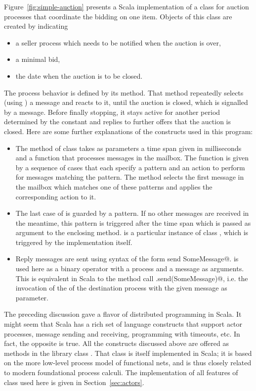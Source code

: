 \documentclass[11pt]{report}
\begin{document}
Figure~\ref{fig:simple-auction} presents a Scala implementation of a
class \verb@Auction@ for auction processes that coordinate the bidding
on one item. Objects of this class are created by indicating
\begin{itemize}
\item
a seller process which needs to be notified when the auction is over,
\item
a minimal bid,
\item
the date when the auction is to be closed.
\end{itemize}
The process behavior is defined by its \verb@run@ method. That method
repeatedly selects (using \verb@receiveWithin@) a message and reacts to it,
until the auction is closed, which is signalled by a \verb@TIMEOUT@
message. Before finally stopping, it stays active for another period
determined by the \verb@timeToShutdown@ constant and replies to
further offers that the auction is closed.  Here are some further
explanations of the constructs used in this program:
\begin{itemize}
\item
The \verb@receiveWithin@ method of class \verb@Actor@ takes as
parameters a time span given in milliseconds and a function that
processes messages in the mailbox. The function is given by a sequence
of cases that each specify a pattern and an action to perform for
messages matching the pattern. The \verb@receiveWithin@ method selects
the first message in the mailbox which matches one of these patterns
and applies the corresponding action to it.
\item
The last case of \verb@receiveWithin@ is guarded by a
\verb@TIMEOUT@ pattern. If no other messages are received in the meantime, this
pattern is triggered after the time span which is passed as argument
to the enclosing \verb@receiveWithin@ method. \verb@TIMEOUT@ is a
particular instance of class \verb@Message@, which is triggered by the
\verb@Actor@ implementation itself.
\item
Reply messages are sent using syntax of the form
\verb@destination send SomeMessage@. \verb@send@ is used here as a
binary operator with a process and a message as arguments. This is
equivalent in Scala to the method call
\verb@destination.send(SomeMessage)@, i.e. the invocation of
the \verb@send@ of the destination process with the given message as
parameter.
\end{itemize}
The preceding discussion gave a flavor of distributed programming in
Scala. It might seem that Scala has a rich set of language constructs
that support actor processes, message sending and receiving,
programming with timeouts, etc. In fact, the opposite is true. All the
constructs discussed above are offered as methods in the library class
\verb@Actor@. That class is itself implemented in Scala; it is based
on the more low-level process model of functional nets, and is thus
closely related to modern foundational process calculi. The
implementation of all features of class \verb@Actor@ used here is
given in Section~\ref{sec:actors}.
\end{document}
